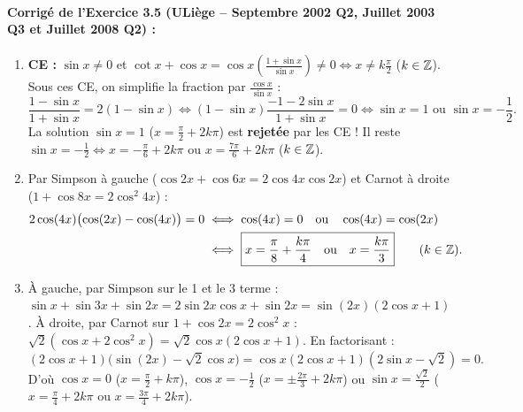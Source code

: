 \paragraph{Corrigé de l'Exercice 3.5 (ULiège -- Septembre 2002 Q2, Juillet 2003 Q3 et Juillet 2008 Q2) :}
\begin{enumerate}[label=(\alph*)]
    \item \textbf{CE :} $\sin x \neq 0$ et $\cot x + \cos x = \cos x\left(\frac{1+\sin x}{\sin x}\right) \neq 0 \iff x \neq k\frac{\pi}{2}$ ($k\in\mathbb{Z}$). Sous ces CE, on simplifie la fraction par $\frac{\cos x}{\sin x}$ :
    \[
        \frac{1 - \sin x}{1 + \sin x} = 2(1 - \sin x) \iff (1 - \sin x)\frac{-1-2\sin x}{1+\sin x} = 0 \iff \sin x = 1 \text{ ou } \sin x = -\frac{1}{2}.
    \]
    La solution $\sin x = 1$ ($x = \frac{\pi}{2}+2k\pi$) est \textbf{rejetée} par les CE ! Il reste $\sin x = -\frac{1}{2} \iff \boxed{x = -\frac{\pi}{6} + 2k\pi \text{ ou } x = \frac{7\pi}{6} + 2k\pi}$ ($k\in\mathbb{Z}$).
    \item Par Simpson à gauche ($\cos 2x + \cos 6x = 2\cos 4x\cos 2x$) et Carnot à droite ($1 + \cos 8x = 2\cos^2 4x$) :
    \begin{align*}
        2\cos(4x)\bigl(\cos(2x) - \cos(4x)\bigr) = 0 &\iff \cos(4x) = 0 \quad \text{ou} \quad \cos(4x) = \cos(2x) \\
        &\iff \boxed{x = \frac{\pi}{8} + \frac{k\pi}{4} \quad \text{ou} \quad x = \frac{k\pi}{3}} \qquad (k\in\mathbb{Z}).
    \end{align*}
    \item À gauche, par Simpson sur le 1 et le 3 terme : $\sin x + \sin 3x + \sin 2x = 2\sin 2x\cos x + \sin 2x = \sin(2x)(2\cos x + 1)$. À droite, par Carnot sur $1 + \cos 2x = 2\cos^2 x$ : $\sqrt{2}(\cos x + 2\cos^2 x) = \sqrt{2}\cos x(2\cos x + 1)$. En factorisant :
    \[
        (2\cos x + 1)\bigl(\sin(2x) - \sqrt{2}\cos x\bigr) = \cos x(2\cos x + 1)(2\sin x - \sqrt{2}) = 0.
    \]
    D'où $\cos x = 0$ ($x = \frac{\pi}{2}+k\pi$), $\cos x = -\frac{1}{2}$ ($x = \pm\frac{2\pi}{3}+2k\pi$) ou $\sin x = \frac{\sqrt{2}}{2}$ ($x = \frac{\pi}{4}+2k\pi$ ou $x = \frac{3\pi}{4}+2k\pi$).
\end{enumerate}

